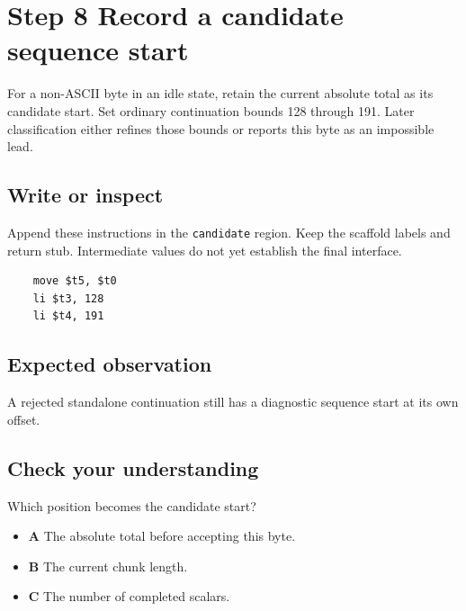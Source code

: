 \section{Step 8 Record a candidate sequence start}\label{utf8-s08}

For a non-ASCII byte in an idle state, retain the current absolute total as its candidate start. Set ordinary continuation bounds 128 through 191. Later classification either refines those bounds or reports this byte as an impossible lead.

\subsection{Write or inspect}
Append these instructions in the \texttt{candidate} region. Keep the scaffold labels and return stub. Intermediate values do not yet establish the final interface.

\begin{verbatim}
    move $t5, $t0
    li $t3, 128
    li $t4, 191
\end{verbatim}

\subsection{Expected observation}
A rejected standalone continuation still has a diagnostic sequence start at its own offset.

\subsection{Check your understanding}
Which position becomes the candidate start?

\begin{itemize}
  \item \textbf{A} The absolute total before accepting this byte.
  \item \textbf{B} The current chunk length.
  \item \textbf{C} The number of completed scalars.
\end{itemize}
